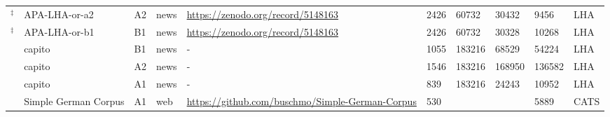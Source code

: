 \documentclass[11pt]{article}
\begin{document}
\begin{table*}
\begin{subtable}[c]{\textwidth}
{\begin{tabular}{p{3.5cm}p{3.2cm}|p{4cm}lp{5cm}lllll}
\citet{spring-etal-2021-exploring,ebling-etal-2022-automatic} $^\ddagger$ & APA-LHA-or-a2 & A2 & news & \url{https://zenodo.org/record/5148163} & 2426 & 60732 & 30432 & 9456 & LHA \\
\citet{spring-etal-2021-exploring,ebling-etal-2022-automatic} $^\ddagger$ & APA-LHA-or-b1 & B1 & news & \url{https://zenodo.org/record/5148163} & 2426 & 60732 & 30328 & 10268 & LHA \\
\citet{spring-etal-2021-exploring,ebling-etal-2022-automatic} & capito & B1 & news & - & 1055 & 183216 & 68529 & 54224 & LHA \\
\citet{spring-etal-2021-exploring,ebling-etal-2022-automatic} & capito & A2 & news & - & 1546 & 183216 & 168950 & 136582 & LHA \\
\citet{spring-etal-2021-exploring,ebling-etal-2022-automatic} & capito & A1 & news & - & 839 & 183216 & 24243 & 10952 & LHA \\
\citet{toborek-etal-2022-new} & Simple German Corpus & A1 & web & \url{https://github.com/buschmo/Simple-German-Corpus} & 530 &  &  & 5889 & CATS


\end{tabular}}
\end{subtable}
\end{table*}
\end{document}
